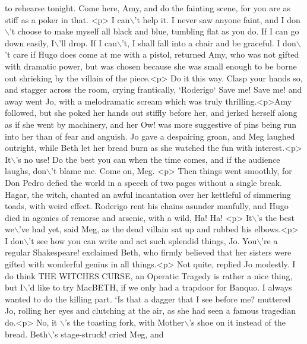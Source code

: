 \begin{DoxyCode}
{       to rehearse tonight. Come here, Amy, and do the fainting scene, for you are as stiff as a poker in that.
       <p> I can\(\backslash\)'t help it. I never saw anyone faint, and I don\(\backslash\)'t choose to make myself all black and blue,
       tumbling flat as you do. If I can go down easily, I\(\backslash\)'ll drop. If I can\(\backslash\)'t, I shall fall into a chair and be
       graceful. I don\(\backslash\)'t care if Hugo does come at me with a pistol,  returned Amy, who was not gifted with dramatic
       power, but was chosen because she was small enough to be borne out shrieking by the villain of the piece.<p> Do
       it this way. Clasp your hands so, and stagger across the room, crying frantically, `Roderigo` Save me! Save
       me! and away went Jo, with a melodramatic scream which was truly thrilling.<p>Amy followed, but she poked
       her hands out stiffly before her, and jerked herself along as if she went by machinery, and her  Ow!  was more
       suggestive of pins being run into her than of fear and anguish. Jo gave a despairing groan, and Meg laughed
       outright, while Beth let her bread burn as she watched the fun with interest.<p> It\(\backslash\)'s no use! Do the best
       you can when the time comes, and if the audience laughs, don\(\backslash\)'t blame me. Come on, Meg. <p> Then things went
       smoothly, for Don Pedro defied the world in a speech of two pages without a single break. Hagar, the witch,
       chanted an awful incantation over her kettleful of simmering toads, with weird effect. Roderigo rent his
       chains asunder manfully, and Hugo died in agonies of remorse and arsenic, with a wild, Ha! Ha! <p> It\(\backslash\)'s the
       best we\(\backslash\)'ve had yet,  said Meg, as the dead villain sat up and rubbed his elbows.<p> I don\(\backslash\)'t see how you can
       write and act such splendid things, Jo. You\(\backslash\)'re a regular Shakespeare!  exclaimed Beth, who firmly believed
       that her sisters were gifted with wonderful genius in all things.<p> Not quite,  replied Jo modestly.  I do
       think THE WITCHES CURSE, an Operatic Tragedy is rather a nice thing, but I\(\backslash\)'d like to try MacBETH, if we
       only had a trapdoor for Banquo. I always wanted to do the killing part. `Is that a dagger that I see before
       me?  muttered Jo, rolling her eyes and clutching at the air, as she had seen a famous tragedian do.<p> No, it
      \(\backslash\)'s the toasting fork, with Mother\(\backslash\)'s shoe on it instead of the bread. Beth\(\backslash\)'s stage-struck!  cried Meg, and
}
\end{DoxyCode}

